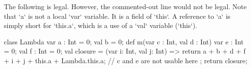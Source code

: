 \begin{eg}
 The following is legal.  
However, the commented-out line would not be legal.
Note that \xcd`a` is not a local \xcd`var` variable. It is a field of
\xcd`this`. A reference to \xcd`a` is simply short for \xcd`this.a`, which is
a use of a \xcd`val` variable (\xcd`this`).  
\begin{xten}
class Lambda {
   var a : Int = 0;
   val b = 0;
   def m(var c : Int, val d : Int) {
      var e : Int = 0;
      val f : Int = 0;
      val closure = (var i: Int, val j: Int) => {
    	  return a + b + d + f + i 
               + j + this.a + Lambda.this.a;
          // c and e are not usable here
      };
      return closure;
   }
}
\end{xten}
%


% 
\begin{xten}
\end{xten}
%



\end{eg}

